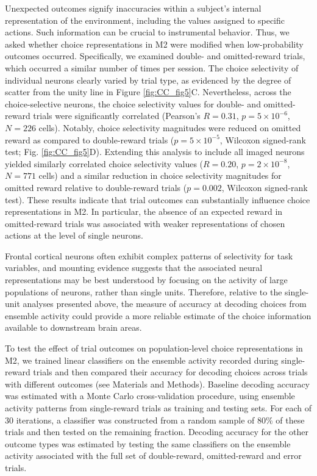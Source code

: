 

Unexpected outcomes signify inaccuracies within a subject’s internal representation of the environment, including the values assigned to specific actions. Such information can be crucial to instrumental behavior. Thus, we asked whether choice representations in M2 were modified when low-probability outcomes occurred. Specifically, we examined double- and omitted-reward trials, which occurred a similar number of times per session. The choice selectivity of individual neurons clearly varied by trial type, as evidenced by the degree of scatter from the unity line in Figure \ref{fig:CC_fig5}C. Nevertheless, across the choice-selective neurons, the choice selectivity values for double- and omitted-reward trials were significantly correlated (Pearson's $R = 0.31$, $p = 5 \times 10^{-6}$, $N = 226$ cells). Notably, choice selectivity magnitudes were reduced on omitted reward as compared to double-reward trials ($p = 5 \times 10^{-5}$, Wilcoxon signed-rank test; Fig. \ref{fig:CC_fig5}D). Extending this analysis to include all imaged neurons yielded similarly correlated choice selectivity values ($R = 0.20$, $p = 2 \times 10^{-8}$, $N = 771$ cells) and a similar reduction in choice selectivity magnitudes for omitted reward relative to double-reward trials ($p = 0.002$, Wilcoxon signed-rank test). These results indicate that trial outcomes can substantially influence choice representations in M2. In particular, the absence of an expected reward in omitted-reward trials was associated with weaker representations of chosen actions at the level of single neurons.

Frontal cortical neurons often exhibit complex patterns of selectivity for task variables, and mounting evidence suggests that the associated neural representations may be best understood by focusing on the activity of large populations of neurons, rather than single units. Therefore, relative to the single-unit analyses presented above, the measure of accuracy at decoding choices from ensemble activity could provide a more reliable estimate of the choice information available to downstream brain areas.

To test the effect of trial outcomes on population-level choice representations in M2, we trained linear classifiers on the ensemble activity recorded during single-reward trials and then compared their accuracy for decoding choices across trials with different outcomes (see Materials and Methods). Baseline decoding accuracy was estimated with a Monte Carlo cross-validation procedure, using ensemble activity patterns from single-reward trials as training and testing sets. For each of 30 iterations, a classifier was constructed from a random sample of 80\% of these trials and then tested on the remaining fraction. Decoding accuracy for the other outcome types was estimated by testing the same classifiers on the ensemble activity associated with the full set of double-reward, omitted-reward and error trials.

